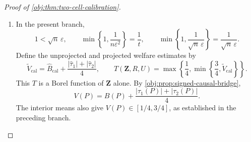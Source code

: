 \documentclass[11pt]{article}
\begin{document}
\begin{proof}[Proof of \cref{obj:thm:two-cell-calibration}]
\begin{enumerate}
Conditional on the records, the transcript atom probability is the product of its participant-specific atom probabilities. Integrating against the product record law from
\cref{obj:ass:iid-people}, and using
\cref{obj:ass:independent-randomness}, gives the transcript identity
\[
\mathbb P\{\mathbf Z=((h_i,z_i))_{i=1}^{n}\}
=
\prod_{i=1}^{n}
\int Q_i(\{(h_i,z_i)\}\mid o)\,P_O(do).
\]
Thus distinct message rows are independent under the sampling decision law.

For \(i\le m_{\mathrm{bin}}\), direct summation over the binary message gives
\[
\mathbb E[\mathsf H_i^{\mathrm{cal}}\mid O_i]
=\delta(2Y_i-1),
\qquad
\mathbb E[\mathsf H_i^{\mathrm{cal}}]
=\delta(2B(P)-1),
\qquad
\mathbb E[(\mathsf H_i^{\mathrm{cal}})^2]=1.
\]
It follows that
\[
\mathbb E[\widehat B_{\mathrm{cal}}]=B(P),
\qquad
\operatorname{Var}\left(
\sum_{i=1}^{m_{\mathrm{bin}}}\mathsf H_i^{\mathrm{cal}}
\right)
=
\sum_{i=1}^{m_{\mathrm{bin}}}
\operatorname{Var}(\mathsf H_i^{\mathrm{cal}})
\le m_{\mathrm{bin}}.
\]
Scaling this centered sum proves
\[
\mathbb E[(\widehat B_{\mathrm{cal}}-B(P))^2]
\le\frac1{4m_{\mathrm{bin}}\delta^2}.
\]

For the vector block, \cref{obj:lem:private-moment-and-dependence} supplies
\[
\mathbb E[W_{ij}^{\mathrm{cal}}]=\tau_j(P),
\qquad
\mathbb E[(W_{ij}^{\mathrm{cal}})^2]=b^2.
\]
The hypotheses of that result hold with block size \(m_{\mathrm{vec}}\), since
\(0<m_{\mathrm{vec}}\le n\), \(d=2\), and \(P\in\mathcal V_2\).
Expanding the squared column sum and using independence of distinct rows yields, for each \(j\in[2]\),
\[
\begin{aligned}
\mathbb E[\widehat\tau_j]
&=\tau_j(P),\\
\mathbb E[\widehat\tau_j^2]
&=\frac{
m_{\mathrm{vec}}b^2+
m_{\mathrm{vec}}(m_{\mathrm{vec}}-1)\tau_j(P)^2
}{m_{\mathrm{vec}}^2}
=\tau_j(P)^2+
\frac{b^2-\tau_j(P)^2}{m_{\mathrm{vec}}}.
\end{aligned}
\]
Subtracting the squared mean therefore gives
\[
\mathbb E[(\widehat\tau_j-\tau_j(P))^2]
=
\frac{b^2-\tau_j(P)^2}{m_{\mathrm{vec}}}
\le\frac{b^2}{m_{\mathrm{vec}}}
=\frac4{m_{\mathrm{vec}}\delta^2}.
\]
All three statistics are Borel functions of the finite transcript alone. These are the required component bounds, simultaneously for every \(P\in\mathcal V_2\).

\item
In the present branch,
\[
1<\sqrt n\,\varepsilon,
\qquad
\min\left\{1,\frac1{n\varepsilon^2}\right\}
=\frac1t,
\qquad
\min\left\{1,\frac1{\sqrt n\,\varepsilon}\right\}
=\frac1{\sqrt n\,\varepsilon}.
\]
Define the unprojected and projected welfare estimates by
\[
\widetilde V_{\mathrm{cal}}
=\widehat B_{\mathrm{cal}}
+\frac{|\widehat\tau_1|+|\widehat\tau_2|}{4},
\qquad
T(\mathbf Z,R,U)
=\max\left\{\frac14,
\min\left\{\frac34,\widetilde V_{\mathrm{cal}}\right\}\right\}.
\]
This \(T\) is a Borel function of \(\mathbf Z\) alone.
By \cref{obj:prop:signed-causal-bridge},
\[
V(P)=B(P)+\frac{|\tau_1(P)|+|\tau_2(P)|}{4}.
\]
The interior means also give \(V(P)\in[1/4,3/4]\), as established in the preceding branch.


\end{enumerate}
\end{proof}
\end{document}
